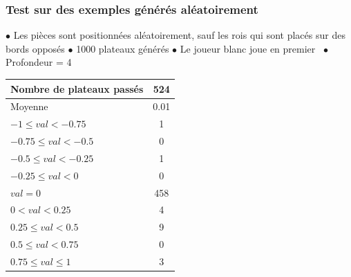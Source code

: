 \documentclass[11pt]{beamer}
\begin{document}
\begin{frame}
	\frametitle{Test sur des exemples générés aléatoirement}
	$\bullet $ Les pièces sont positionnées aléatoirement, sauf les rois qui sont placés sur des bords opposés \newline
	$\bullet$ 1000 plateaux générés \newline
	$\bullet $ Le joueur blanc joue en premier \newline
	$\bullet $ Profondeur = 4
	\begin{center}
		
		\begin{tabular}{ | l | c | }
			\hline
			Nombre de plateaux passés & 524 \\ \hline
			Moyenne & 0.01 \\ \hline
			$-1 \leq val < -0.75$ & 1  \\ \hline
			$-0.75 \leq val < -0.5$ & 0  \\ \hline
			$-0.5 \leq val < -0.25$ & 1  \\ \hline
			$-0.25 \leq val < 0$ & 0 \\ \hline
			$val = 0 $   & 458  \\ \hline
			$0 < val < 0.25$ & 4  \\ \hline
			$0.25 \leq val < 0.5$ & 9  \\ \hline
			$0.5 \leq val < 0.75$ & 0  \\ \hline
			$0.75 \leq val \leq 1$ & 3  \\
			\hline
			\hline
		\end{tabular}
	\end{center}	
\end{frame}
\end{document}

